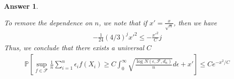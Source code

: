\documentclass[12pt]{article}
\theoremstyle{colon}
\newtheorem*{answer}{Answer}
\begin{document}
\begin{answer}
\begin{enumerate}[label=\arabic*)]
      To remove the dependence on $n$, we note that if $x' = \frac{x}{\sqrt{n}}$, then we have
      \begin{gather*}
        -\frac{1}{24} (4/3)^j x'^2 \leq - \frac{x'^2}{C} j
      \end{gather*}
      Thus, we conclude that there exists a universal $C$
      \begin{gather*}
        \mathbb{P} \left[ \sup_{f \in \mathcal{F}} \frac{1}{n} \sum_{i=1}^n \epsilon_i f(X_i) \geq C \int_0^\infty \sqrt{\frac{\log N(\epsilon, \mathcal{F}, d_n)}{n}} d\epsilon + x' \right] \leq C e^{-x^2/C}
      \end{gather*}
  \end{enumerate}
\end{answer}

\clearpage
\end{document}
